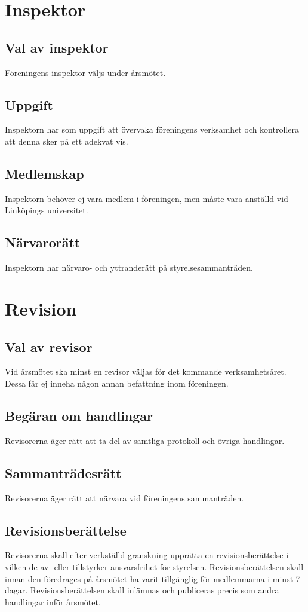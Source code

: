 \documentclass[11pt,a4paper]{article}
\begin{document}
\section{Inspektor}

\subsection{Val av inspektor}
Föreningens inspektor väljs under årsmötet.
\subsection{Uppgift}
Inspektorn har som uppgift att övervaka föreningens verksamhet och kontrollera att denna sker på ett adekvat vis.\subsection{Medlemskap}
Inspektorn behöver ej vara medlem i föreningen, men måste vara anställd vid Linköpings universitet.
\subsection{Närvarorätt}
Inspektorn har närvaro- och yttranderätt på styrelsesammanträden.


\section{Revision}

\subsection{Val av revisor}
Vid årsmötet ska minst en revisor väljas för det kommande verksamhetsåret. Dessa får ej inneha någon annan befattning inom föreningen.
\subsection{Begäran om handlingar}
Revisorerna äger rätt att ta del av samtliga protokoll och övriga handlingar.
\subsection{Sammanträdesrätt}
Revisorerna äger rätt att närvara vid föreningens sammanträden.
\subsection{Revisionsberättelse}
Revisorerna skall efter verkställd granskning upprätta en revisionsberättelse i vilken de av- eller tillstyrker ansvarsfrihet för styrelsen. Revisionsberättelsen skall innan den föredrages på årsmötet ha varit tillgänglig för medlemmarna i minst 7 dagar. Revisionsberättelsen skall inlämnas och publiceras precis som andra handlingar inför årsmötet.
\end{document}
